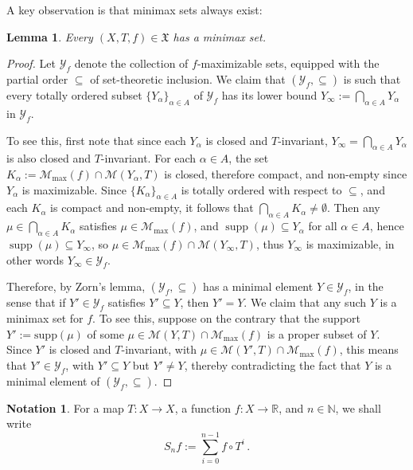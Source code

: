 \documentclass[reqno,11pt]{amsart}
\newtheorem{lem}[thm]{Lemma}
\theoremstyle{definition}
\newtheorem{notation}[thm]{Notation}
\theoremstyle{remark}
\theoremstyle{remark}
\def \N {\mathbb N}
\def \R {\mathbb R}
\def\m{\mathcal M}
\newcommand{\supp}{\operatorname{supp}}
\def\X{\mathfrak{X}}
\numberwithin{equation}{section}
\begin{document}
A key observation is that minimax sets always exist:

\begin{lem}\label{minmaxexistence}
Every $(X,T,f)\in\X$ has a minimax set.
\end{lem}
\begin{proof}
Let $\mathcal{Y}_f$ denote the collection of $f$-maximizable sets, equipped with the partial order $\subseteq$
of set-theoretic inclusion.
We claim that $(\mathcal{Y}_f,\subseteq)$ is such that every totally ordered subset $\{Y_\alpha\}_{\alpha \in A}$
of $\mathcal{Y}_f$
has its lower bound 
$Y_\infty := \bigcap_{\alpha \in A} Y_\alpha$ in $\mathcal{Y}_f$.

To see this, first note that since each $Y_\alpha$ is closed and $T$-invariant, $Y_\infty = \bigcap_{\alpha \in A} Y_\alpha$ 
is also closed and $T$-invariant.
For each $\alpha\in A$, the set
$
K_\alpha := \m_{\max}(f) \cap \m(Y_\alpha,T)
$ is closed, therefore compact, and non-empty since $Y_\alpha$ is maximizable.
Since $\{K_\alpha\}_{\alpha \in A}$ is totally ordered with respect to $\subseteq$,
and each $K_\alpha$ is compact and non-empty,
it follows that $\bigcap_{\alpha \in A} K_\alpha \neq \emptyset$.
Then any $\mu\in \bigcap_{\alpha \in A} K_\alpha$
satisfies $\mu\in\m_{\max}(f)$, and $\supp(\mu)\subseteq Y_\alpha$ for all $\alpha\in A$,
hence $\supp(\mu)\subseteq Y_\infty$, so $\mu\in \m_{\max}(f) \cap \m(Y_\infty,T)$,
thus $Y_\infty$ is maximizable, in other words $Y_\infty \in\mathcal{Y}_f$.

Therefore, by Zorn's lemma, $(\mathcal{Y}_f,\subseteq)$ has a minimal element $Y\in \mathcal{Y}_f$,
in the sense that if $Y'\in\mathcal{Y}_f$ satisfies $Y'\subseteq Y$, then $Y'=Y$.
We claim that any such $Y$ is a minimax set for $f$.
To see this, suppose on the contrary that the support $Y':=\text{supp}(\mu)$ of some $\mu\in\m(Y,T)\cap \m_{\max}(f)$ is a proper subset of $Y$. Since $Y'$ is closed and $T$-invariant, with $\mu\in\m(Y',T)\cap\m_{\max}(f)$, this means that $Y'\in\mathcal{Y}_f$,
with $Y'\subseteq Y$ but $Y'\neq Y$, thereby contradicting the fact that $Y$ is a minimal element of  
$(\mathcal{Y}_f,\subseteq)$.
\end{proof}



\begin{notation} For a map $T:X\to X$, a function $f:X\to\R$, and $n\in\N$, we shall write
$$
S_nf:=\sum_{i=0}^{n-1} f\circ T^i\,.
$$
\end{notation}
\end{document}

